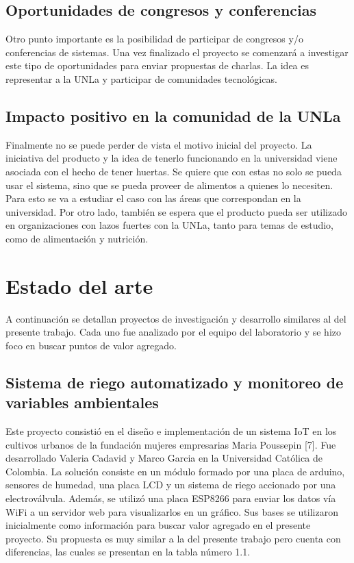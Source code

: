 \subsection{Oportunidades de congresos y conferencias}
Otro punto importante es la posibilidad de participar de congresos y/o conferencias de sistemas. Una vez finalizado el proyecto se comenzará a investigar este tipo de oportunidades para enviar propuestas de charlas. La idea es representar a la UNLa y participar de comunidades tecnológicas.

\subsection{Impacto positivo en la comunidad de la UNLa}
Finalmente no se puede perder de vista el motivo inicial del proyecto. La iniciativa del producto y la idea de tenerlo funcionando en la universidad viene asociada con el hecho de tener huertas. Se quiere que con estas no solo se pueda usar el sistema, sino que se pueda proveer de alimentos a quienes lo necesiten. Para esto se va a estudiar el caso con las áreas que correspondan en la universidad. Por otro lado, también se espera que el producto pueda ser utilizado en organizaciones con lazos fuertes con la UNLa, tanto para temas de estudio, como de alimentación y nutrición.


\section{Estado del arte}
A continuación se detallan proyectos de investigación y desarrollo similares al del presente trabajo. Cada uno fue analizado por el equipo del laboratorio y se hizo foco en buscar puntos de valor agregado.\\

\subsection{Sistema de riego automatizado y monitoreo de variables ambientales}
Este proyecto consistió en el diseño e implementación de un sistema IoT en los cultivos urbanos de la fundación mujeres empresarias Maria Poussepin [7].
Fue desarrollado Valeria Cadavid y Marco Garcia en la Universidad Católica de Colombia.
La solución consiste en un módulo formado por una placa de arduino, sensores de humedad, una placa LCD y un sistema de riego accionado por una electroválvula. Además, se utilizó una placa ESP8266 para enviar los datos vía WiFi a un servidor web para visualizarlos en un gráfico. Sus bases se utilizaron inicialmente como información para buscar valor agregado en el presente proyecto. Su propuesta es muy similar a la del presente trabajo pero cuenta con diferencias, las cuales se presentan en la tabla número 1.1.\\

